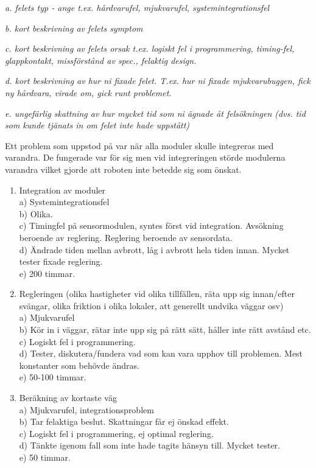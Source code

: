 \documentclass[11pt]{article}
\begin{document}
\textit{a. felets typ - ange t.ex.  hårdvarufel, mjukvarufel, systemintegrationsfel }

\textit{b. kort beskrivning av felets symptom }

\textit{c. kort beskrivning av felets orsak t.ex. logiskt fel i programmering, timing-fel, glappkontakt, missförstånd av spec., felaktig design. }

\textit{d. kort beskrivning av hur ni fixade felet. T.ex. hur ni fixade mjukvarubuggen, fick ny hårdvara, virade om, gick runt problemet. }

\textit{e. ungefärlig skattning av hur mycket tid som ni ägnade åt felsökningen (dvs. tid som kunde tjänats in om felet inte hade uppstått)}

Ett problem som uppstod på var när alla moduler skulle integreras med varandra. De fungerade var för sig men vid integreringen störde modulerna varandra vilket gjorde att roboten inte betedde sig som önskat.

\begin{enumerate}
  
  \item Integration av moduler\\
  a) Systemintegrationsfel\\
  b) Olika. \\
  c) Timingfel på sensormodulen, syntes först vid integration. Avsökning beroende av reglering. Reglering beroende av sensordata.\\
  d) Ändrade tiden mellan avbrott, låg i avbrott hela tiden innan. Mycket tester fixade reglering.\\
  e) 200 timmar.
  
   \item Regleringen (olika hastigheter vid olika tillfällen, räta upp sig innan/efter svängar, olika friktion i olika lokaler, att generellt undvika väggar osv)\\
  a) Mjukvarufel \\
  b) Kör in i väggar, rätar inte upp sig på rätt sätt, håller inte rätt avstånd etc.\\
  c) Logiskt fel i programmering. \\
  d) Tester, diskutera/fundera vad som kan vara upphov till problemen. Mest konstanter som behövde ändras.\\
  e) 50-100 timmar.
  
  \item Beräkning av kortaste väg\\
  a) Mjukvarufel, integrationsproblem\\
  b) Tar felaktiga beslut. Skattningar får ej önskad effekt. \\
  c) Logiskt fel i programmering, ej optimal reglering.\\
  d) Tänkte igenom fall som inte hade tagits hänsyn till. Mycket tester.\\
  e) 50 timmar.
  
\end{enumerate}
\end{document}
